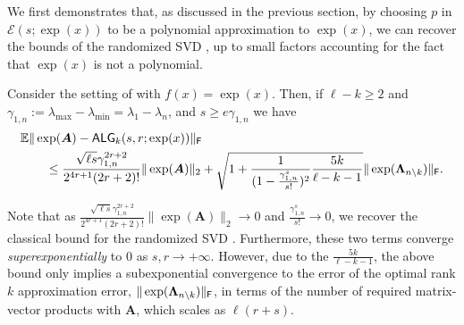 We first demonstrates that, as discussed in the previous section, by choosing $p$ in $\mathcal{E}(s;\exp(x))$ to be a polynomial approximation to $\exp(x)$, we can recover the bounds of the randomized SVD \cite[Theorem 10.5]{rsvd}, up to small factors accounting for the fact that $\exp(x)$ is not a polynomial. %





\begin{corollary}\label{theorem:rsvd_like_bound}
Consider the setting of  with $f(x) = \exp(x)$. Then, if $\ell-k\geq 2$ and $\gamma_{1,n} := \lambda_{\max} - \lambda_{\min} = \lambda_1-\lambda_n$, and $s \geq e\gamma_{1,n}$ we have
\begin{align*}
     &\mathbb{E}\|\exp(\bm{A}) - \textsf{\textup{ALG}}_k(s,r;\exp(x))\|_{\textsf{\textup{F}}} 
     \\&\hspace{2em}
     \leq  \frac{\sqrt{\ell s}\gamma_{1,n}^{2r+2}}{2^{4r+1}(2r+2)!}\|\exp(\bm{A})\|_2 + \sqrt{1 +  \frac{1}{(1-\frac{\gamma_{1,n}^s}{s!})^2}\frac{5k}{\ell - k - 1}} \|\exp(\bm{\Lambda}_{n \setminus k })\|_{\textsf{\textup{F}}}.
\end{align*}
\end{corollary}
Note that as $\frac{\sqrt{\ell s}\gamma_{1,n}^{2r+2}}{2^{4r+1}(2r+2)!}\|\exp(\bm{A})\|_2 \to 0$ and $\frac{\gamma_{1,n}^s}{s!} \to 0$, we recover the classical bound for the randomized SVD \cite[Theorem 10.5]{rsvd}. Furthermore, these two terms converge \emph{superexponentially} to $0$ as $s,r \to +\infty$. However, due to the $\frac{5k}{\ell -k -1}$, the above bound only implies a subexponential convergence to the error of the optimal rank $k$ approximation error, $\|\exp(\bm{\Lambda}_{n \setminus k })\|_{\textsf{\textup{F}}}$, in terms of the number of required matrix-vector products with $\bm{A}$, which scales as $\ell (r+s)$.

